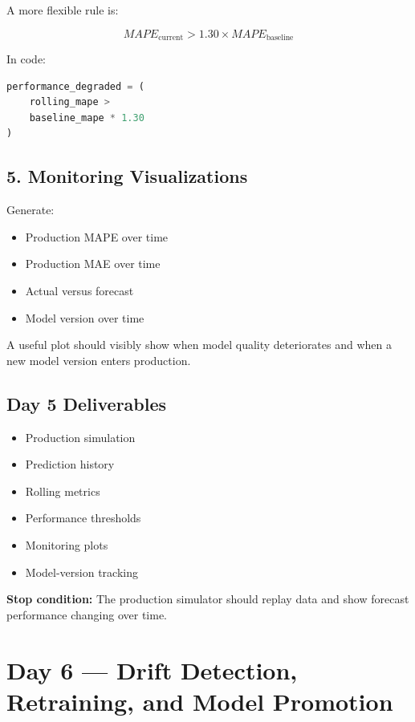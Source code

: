 \documentclass[11pt,a4paper]{article}
\newcommand{\done}{\textbf{\textcolor{codegreen}{✓}}}
\begin{document}
A more flexible rule is:

\[
MAPE_{\text{current}}
>
1.30 \times
MAPE_{\text{baseline}}
\]

In code:

\begin{lstlisting}[language=Python]
performance_degraded = (
    rolling_mape >
    baseline_mape * 1.30
)
\end{lstlisting}

\subsection{5. Monitoring Visualizations}

Generate:

\begin{itemize}
    \item Production MAPE over time
    \item Production MAE over time
    \item Actual versus forecast
    \item Model version over time
\end{itemize}

A useful plot should visibly show when model quality deteriorates and when a new model version enters production.

\subsection{Day 5 Deliverables}

\begin{itemize}
    \item[\done] Production simulation
    \item[\done] Prediction history
    \item[\done] Rolling metrics
    \item[\done] Performance thresholds
    \item[\done] Monitoring plots
    \item[\done] Model-version tracking
\end{itemize}

\textbf{Stop condition:} The production simulator should replay data and show forecast performance changing over time.

\newpage


\section{Day 6 --- Drift Detection, Retraining, and Model Promotion}
\end{document}
